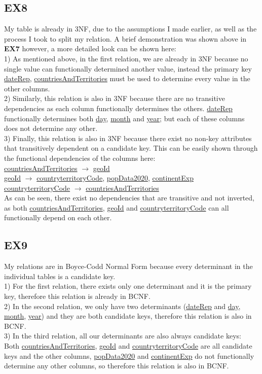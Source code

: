 \documentclass[10pt]{article}
\begin{document}
\subsection{EX8}
My table is already in 3NF, due to the assumptions I made earlier, as well as the process I took to split my relation. A brief demonstration was shown above in \textbf{EX7} however, a more detailed look can be shown here: \\
1) As mentioned above, in the first relation, we are already in 3NF because no single value can functionally determined another value, instead the primary key \underline{dateRep}, \underline{countriesAndTerritories} must be used to determine every value in the other columns.\\
2) Similarly, this relation is also in 3NF because there are no transitive dependencies as each column functionally determines the others. \underline{dateRep} functionally determines both \underline{day}, \underline{month} and \underline{year}; but each of these columns does not determine any other.\\
3) Finally, this relation is also in 3NF because there exist no non-key attributes that transitively dependent on a candidate key. This can be easily shown through the functional dependencies of the columns here:\\
\underline{countriesAndTerritories} $\rightarrow$ \underline{geoId}\\
\underline{geoId} $\rightarrow$ \underline{countryterritoryCode}, \underline{popData2020}, \underline{continentExp}\\
\underline{countryterritoryCode} $\rightarrow$ \underline{countriesAndTerritories}\\
As can be seen, there exist no dependencies that are transitive and not inverted, as both \underline{countriesAndTerritories}, \underline{geoId} and \underline{countryterritoryCode} can all functionally depend on each other.

\subsection{EX9}
My relations are in Boyce-Codd Normal Form because every determinant in the individual tables is a candidate key.\\
1) For the first relation, there exists only one determinant and it is the primary key, therefore this relation is already in BCNF.\\
2) In the second relation, we only have two determinants (\underline{dateRep} and \underline{day}, \underline{month}, \underline{year}) and they are both candidate keys, therefore this relation is also in BCNF.\\
3) In the third relation, all our determinants are also always candidate keys:\\
Both \underline{countriesAndTerritories}, \underline{geoId} and \underline{countryterritoryCode} are all candidate keys and the other columns, \underline{popData2020} and \underline{continentExp} do not functionally determine any other columns, so therefore this relation is also in BCNF.
\end{document}
